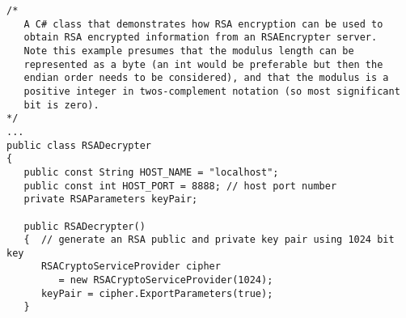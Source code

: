 \begin{lstlisting}[caption=RSA encryption in C\#]
/*
   A C# class that demonstrates how RSA encryption can be used to
   obtain RSA encrypted information from an RSAEncrypter server.
   Note this example presumes that the modulus length can be
   represented as a byte (an int would be preferable but then the
   endian order needs to be considered), and that the modulus is a
   positive integer in twos-complement notation (so most significant
   bit is zero).
*/
...
public class RSADecrypter
{
   public const String HOST_NAME = "localhost";
   public const int HOST_PORT = 8888; // host port number
   private RSAParameters keyPair;

   public RSADecrypter()
   {  // generate an RSA public and private key pair using 1024 bit key
      RSACryptoServiceProvider cipher
         = new RSACryptoServiceProvider(1024);
      keyPair = cipher.ExportParameters(true);
   }


\end{lstlisting}
